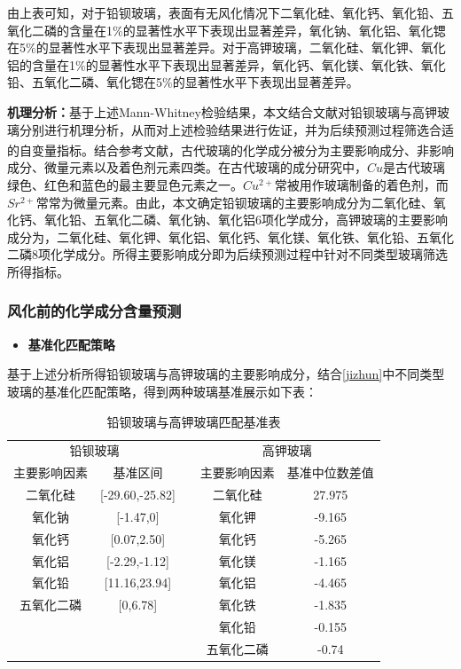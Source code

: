 \documentclass[withoutpreface,bwprint]{cumcmthesis} %
\begin{document}
由上表可知，对于铅钡玻璃，表面有无风化情况下二氧化硅、氧化钙、氧化铅、五氧化二磷的含量在1$\%$的显著性水平下表现出显著差异，氧化钠、氧化铝、氧化锶在5$\%$的显著性水平下表现出显著差异。对于高钾玻璃，二氧化硅、氧化钾、氧化铝的含量在1$\%$的显著性水平下表现出显著差异，氧化钙、氧化镁、氧化铁、氧化铅、五氧化二磷、氧化锶在5$\%$的显著性水平下表现出显著差异。

\textbf{机理分析：}基于上述Mann-Whitney检验结果，本文结合文献对铅钡玻璃与高钾玻璃分别进行机理分析，从而对上述检验结果进行佐证，并为后续预测过程筛选合适的自变量指标。结合参考文献\textsuperscript{\cite{ref1}}，古代玻璃的化学成分被分为主要影响成分、非影响成分、微量元素以及着色剂元素四类。在古代玻璃的成分研究中，$Cu$是古代玻璃绿色、红色和蓝色的最主要显色元素之一。$Cu^{2+}$常被用作玻璃制备的着色剂，而$Sr^{2+}$常常为微量元素。由此，本文确定铅钡玻璃的主要影响成分为二氧化硅、氧化钙、氧化铅、五氧化二磷、氧化钠、氧化铝6项化学成分，高钾玻璃的主要影响成分为，二氧化硅、氧化钾、氧化铝、氧化钙、氧化镁、氧化铁、氧化铅、五氧化二磷8项化学成分。所得主要影响成分即为后续预测过程中针对不同类型玻璃筛选所得指标。

\subsubsection{风化前的化学成分含量预测}

\begin{itemize}
  \item \textbf{基准化匹配策略}
\end{itemize}

基于上述分析所得铅钡玻璃与高钾玻璃的主要影响成分，结合\ref{jizhun}中不同类型玻璃的基准化匹配策略，得到两种玻璃基准展示如下表：
\begin{table}[H]
  \centering
  \caption{铅钡玻璃与高钾玻璃匹配基准表}
  \begin{tabular}{ccccc}
    \toprule[1.5pt]
    \multicolumn{2}{c}{铅钡玻璃}     &  & \multicolumn{2}{c}{高钾玻璃} \\ \cline{1-2} \cline{4-5} 
    主要影响因素 & 基准区间                &  & 主要影响因素     & 基准中位数差值     \\ \hline
    二氧化硅   & {[}-29.60,-25.82{]} &  & 二氧化硅       & 27.975      \\
    氧化钠    & {[}-1.47,0{]}       &  & 氧化钾        & -9.165      \\
    氧化钙    & {[}0.07,2.50{]}     &  & 氧化钙        & -5.265      \\
    氧化铝    & {[}-2.29,-1.12{]}   &  & 氧化镁        & -1.165      \\
    氧化铅    & {[}11.16,23.94{]}   &  & 氧化铝        & -4.465      \\
    五氧化二磷  & {[}0,6.78{]}        &  & 氧化铁        & -1.835      \\
    &                     &  & 氧化铅        & -0.155      \\
    &                     &  & 五氧化二磷      & -0.74       \\ \bottomrule[1.5pt]
  \end{tabular}
\end{table}
\end{document}
